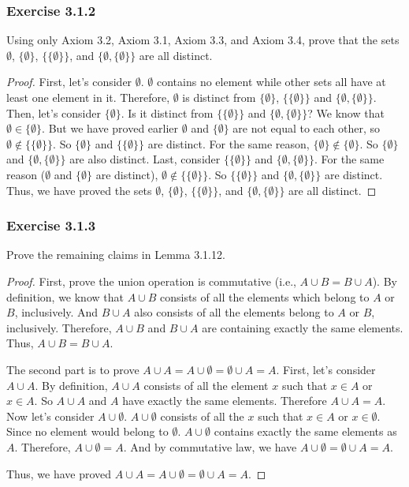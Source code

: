 \documentclass[12pt, letter]{article}
\begin{document}
\subsubsection*{Exercise 3.1.2}
Using only Axiom 3.2, Axiom 3.1, Axiom 3.3, and Axiom 3.4, prove that the sets $\emptyset$, $\{\emptyset\}$, $\{\{\emptyset\}\}$, and $\{\emptyset,\{\emptyset\}\}$ are all distinct.
\begin{proof}
    First, let's consider $\emptyset$. $\emptyset$ contains no element while other sets all have at least one element in it. Therefore, $\emptyset$ is distinct from $\{\emptyset\}$, $\{\{\emptyset\}\}$ and $\{\emptyset,\{\emptyset\}\}$. 
    Then, let's consider $\{\emptyset\}$. Is it distinct from $\{\{\emptyset\}\}$ and $\{\emptyset,\{\emptyset\}\}$?
    We know that $\emptyset\in\{\emptyset\}$. But we have proved earlier $\emptyset$ and $\{\emptyset\}$ are not equal to each other, so $\emptyset\notin \{\{\emptyset\}\}$. So $\{\emptyset\}$ and $\{\{\emptyset\}\}$ are distinct. For the same reason, 
    $\{\emptyset\}\notin \{\emptyset\}$. So $\{\emptyset\}$ and $\{\emptyset,\{\emptyset\}\}$ are also distinct. Last, consider $\{\{\emptyset\}\}$ and $\{\emptyset,\{\emptyset\}\}$. For the same reason ($\emptyset$ and $\{\emptyset\}$ are distinct), 
    $\emptyset\notin \{\{\emptyset\}\}$. So $\{\{\emptyset\}\}$ and $\{\emptyset,\{\emptyset\}\}$ are distinct. Thus, we have proved the sets $\emptyset$, $\{\emptyset\}$, $\{\{\emptyset\}\}$, and $\{\emptyset,\{\emptyset\}\}$ are all distinct.
\end{proof}
\subsubsection*{Exercise 3.1.3}
Prove the remaining claims in Lemma 3.1.12.
\begin{proof}
    First, prove the union operation is commutative (i.e., $A\cup B=B\cup A$). By definition, we know that $A\cup B$ consists of all the elements which belong to $A$ or $B$, inclusively. 
    And $B\cup A$ also consists of all the elements belong to $A$ or $B$, inclusively. Therefore, $A\cup B$ and $B\cup A$ are containing exactly the same elements. Thus, $A\cup B=B\cup A$.
    
    The second part is to prove $A\cup A=A\cup\emptyset=\emptyset\cup A=A$. First, let's consider $A\cup A$. By definition, $A\cup A$ consists of all the element $x$ such that $x\in A$ or $x\in A$. So $A\cup A$ and $A$ have exactly the same elements. Therefore $A\cup A=A$.
    Now let's consider $A\cup\emptyset$. $A\cup\emptyset$ consists of all the $x$ such that $x\in A$ or $x\in\emptyset$. Since no element would belong to $\emptyset$. $A\cup\emptyset$ contains exactly the same elements as $A$. Therefore, $A\cup\emptyset=A$. And by commutative law, 
    we have $A\cup\emptyset=\emptyset\cup A=A$.

    Thus, we have proved $A\cup A=A\cup\emptyset=\emptyset\cup A=A$.
\end{proof}
\end{document}
